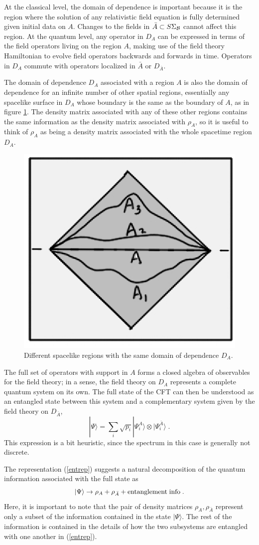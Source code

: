 \documentclass[12pt,epsf]{article}
\newcommand{\be}{\begin{equation}}
\newcommand{\ee}{\end{equation}}
\begin{document}
At the classical level, the domain of dependence is important because it is the region where the solution of any relativistic field equation is fully determined given initial data on $A$. Changes to the fields in $\bar{A} \subset S\Sigma_{\cal B}$ cannot affect this region. At the quantum level, any operator in $D_A$ can be expressed in terms of the field operators living on the region $A$, making use of the field theory Hamiltonian to evolve field operators backwards and forwards in time. Operators in $D_A$ commute with operators localized in $\bar{A}$ or $D_{\bar{A}}$.

The domain of dependence $D_A$ associated with a region $A$ is also the domain of dependence for an infinite number of other spatial regions, essentially any spacelike surface in $D_A$ whose boundary is the same as the boundary of $A$, as in figure \ref{DDAs}. The density matrix associated with any of these other regions contains the same information as the density matrix associated with $\rho_A$, so it is useful to think of $\rho_A$ as being a density matrix associated with the whole spacetime region $D_A$.

\begin{figure}
\centering
\includegraphics[width = 0.3 \textwidth]{DDAs.eps}
\caption{Different spacelike regions with the same domain of dependence $D_A$.}
\label{DDAs}
\end{figure}

The full set of operators with support in $A$ forms a closed algebra of observables for the field theory; in a sense, the field theory on $D_A$ represents a complete quantum system on its own. The full state of the CFT can then be understood as an entangled state between this system and a complementary system given by the field theory on $D_{\bar{A}}$,
\be
\label{entrep}
|\Psi \rangle = \sum_i \sqrt{p_i} |\Psi_i^A \rangle \otimes |\Psi_i^{\bar{A}} \rangle \; .
\ee
This expression is a bit heuristic, since the spectrum in this case is generally not discrete.

The representation (\ref{entrep}) suggests a natural decomposition of the quantum information associated with the full state as
\be
\label{psidecomp}
|\Psi \rangle \to \rho_A + \rho_{\bar{A}} + {\rm entanglement \; info} \; .
\ee
Here, it is important to note that the pair of density matrices $\rho_A,\rho_{\bar{A}}$ represent only a subset of the information contained in the state $|\Psi \rangle$. The rest of the information is contained in the details of how the two subsystems are entangled with one another in (\ref{entrep}).
\end{document}
